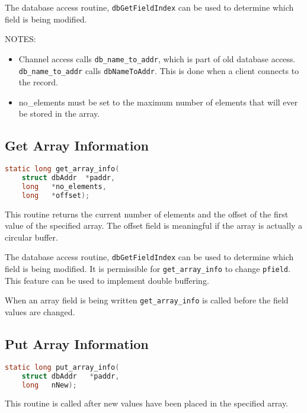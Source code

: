 The database access routine, \verb|dbGetFieldIndex| can be used to determine which field is being modified.

NOTES:

\begin{itemize}
\item Channel access calls \verb|db_name_to_addr|, which is part of old database access.
\verb|db_name_to_addr| calls \verb|dbNameToAddr|.
This is done when a client connects to the record.

\item no\_elements must be set to the maximum number of elements that will ever be stored in the array.

\end{itemize}

\subsection{Get Array Information}

\begin{lstlisting}[language=C]
static long get_array_info(
    struct dbAddr  *paddr,
    long   *no_elements,
    long   *offset);
\end{lstlisting}

This routine returns the current number of elements and the offset of the first value of the specified array.
The offset field is meaningful if the array is actually a circular buffer.

The database access routine, \verb|dbGetFieldIndex| can be used to determine which field is being modified.
It is permissible for \verb|get_array_info| to change \verb|pfield|.
This feature can be used to implement double buffering.

When an array field is being written \verb|get_array_info| is called before the field values are changed.

\subsection{Put Array Information}

\begin{lstlisting}[language=C]
static long put_array_info(
    struct dbAddr   *paddr,
    long   nNew);
\end{lstlisting}

This routine is called after new values have been placed in the specified array.

